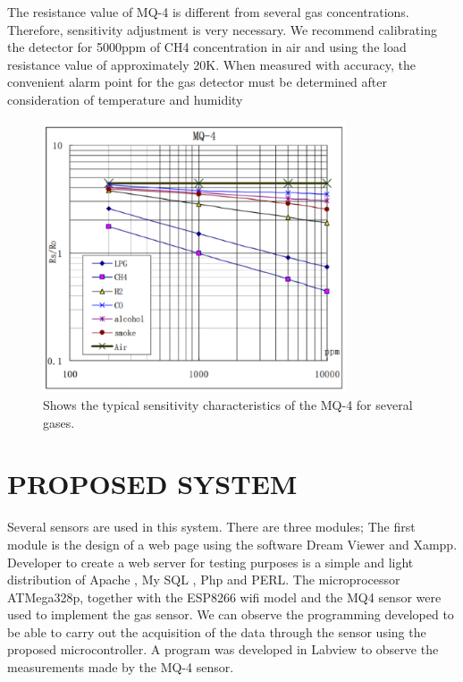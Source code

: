 \documentclass[11pt]{article}
\begin{document}
The resistance value of MQ-4 is different from several gas concentrations. Therefore, sensitivity adjustment is very necessary. We recommend calibrating the detector for 5000ppm of CH4 concentration in air and using the load resistance value of approximately 20K. When measured with accuracy, the convenient alarm point for the gas detector must be determined after consideration of temperature and humidity

\begin{figure}[!htb]
    \centering
    \includegraphics[width=0.8\textwidth]{sensitivity char.png}
    \caption{Shows the typical sensitivity characteristics of
the MQ-4 for several gases.}
    \label{left}
\end{figure} 

\section{PROPOSED SYSTEM}

Several sensors are used in this system. There are three modules; The first module is the design of a web page using the software Dream Viewer and Xampp. Developer to create a web server for testing purposes is a simple and light distribution of Apache , My SQL , Php and PERL. The microprocessor ATMega328p, together with the ESP8266 wifi model and the MQ4 sensor were used to implement the gas sensor. We can observe the programming developed to be able to carry out the acquisition of the data through the sensor using the proposed microcontroller. A program was developed in Labview to observe the measurements made by the MQ-4 sensor.
\end{document}
